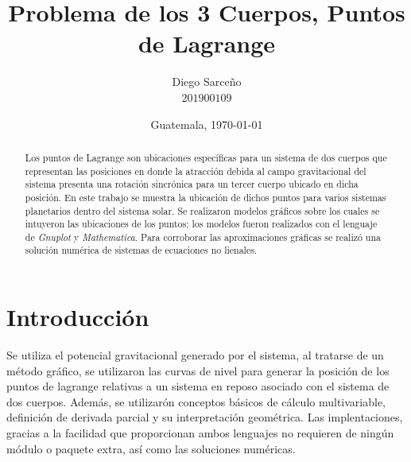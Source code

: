 







\title{\sc Problema de los 3 Cuerpos, Puntos de Lagrange}%
\author{Diego Sarceño \\ $201900109$}
\date{Guatemala, \today}

  
\maketitle

\begin{abstract}
  Los puntos de Lagrange son ubicaciones específicas para un sistema de dos cuerpos que representan las posiciones en donde la atracción debida al campo gravitacional del sistema presenta una rotación sincrónica para un tercer cuerpo ubicado en dicha posición. En este trabajo se muestra la ubicación de dichos puntos para varios sistemas planetarios dentro del sistema solar. Se realizaron modelos gráficos sobre los cuales se intuyeron las ubicaciones de los puntos; los modelos fueron realizados con el lenguaje de \textit{Gnuplot} y \textit{Mathematica}. Para corroborar las aproximaciones gráficas se realizó una solución numérica de sistemas de ecuaciones no lienales.
\end{abstract}


\section{Introducción}
\label{sec:intro}
\justify 
Se utiliza el potencial gravitacional generado por el sistema, al tratarse de un método gráfico, se utilizaron las curvas de nivel para generar la posición de los puntos de lagrange relativas a un sistema en reposo asociado con el sistema de dos cuerpos. Además, se utilizarón conceptos básicos de cálculo multivariable, definición de derivada parcial y su interpretación geométrica. Las implentaciones, gracias a la facilidad que proporcionan ambos lenguajes no requieren de ningún módulo o paquete extra, así como las soluciones numéricas.	


